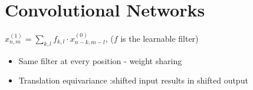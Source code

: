 \section{Convolutional Networks}






$
x_{n, m}^{(1)}=\sum_{k, l} f_{k, l} \cdot x_{n-k, m-l}^{(0)}
$, ($f$ is the learnable filter)




\begin{itemize}
  \item Same filter at every position - weight sharing

  \item Translation equivariance :shifted input results in shifted output

\end{itemize}


